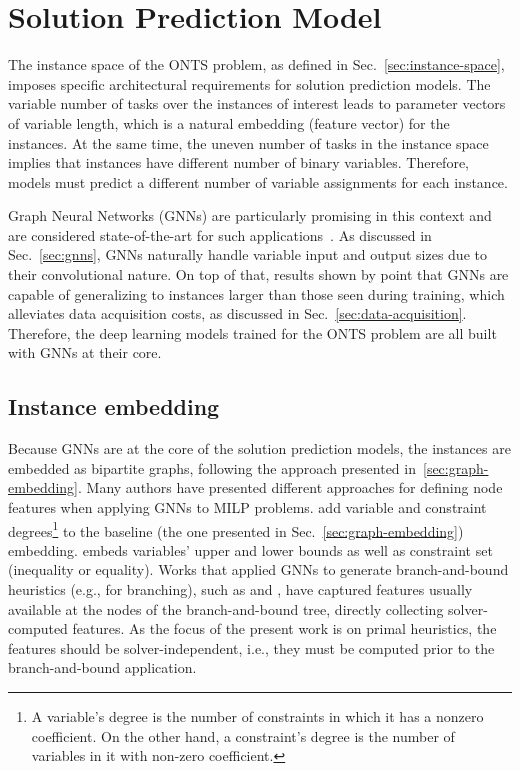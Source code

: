 \section{Solution Prediction Model}

The instance space of the ONTS problem, as defined in Sec.~\ref{sec:instance-space}, imposes specific architectural requirements for solution prediction models.
The variable number of tasks over the instances of interest leads to parameter vectors of variable length, which is a natural embedding (feature vector) for the instances.
At the same time, the uneven number of tasks in the instance space implies that instances have different number of binary variables.
Therefore, models must predict a different number of variable assignments for each instance.

Graph Neural Networks (GNNs) are particularly promising in this context and are considered state-of-the-art for such applications~\cite{cappartCombinatorialOptimizationReasoning2022}.
As discussed in Sec.~\ref{sec:gnns}, GNNs naturally handle variable input and output sizes due to their convolutional nature.
On top of that, results shown by  point that GNNs are capable of generalizing to instances larger than those seen during training, which alleviates data acquisition costs, as discussed in Sec.~\ref{sec:data-acquisition}.
Therefore, the deep learning models trained for the ONTS problem are all built with GNNs at their core.

\subsection{Instance embedding}

Because GNNs are at the core of the solution prediction models, the instances are embedded as bipartite graphs, following the approach presented in~\ref{sec:graph-embedding}.
Many authors have presented different approaches for defining node features when applying GNNs to MILP problems.
 add variable and constraint degrees\footnote{A variable's degree is the number of constraints in which it has a nonzero coefficient. On the other hand, a constraint's degree is the number of variables in it with non-zero coefficient.} to the baseline (the one presented in Sec.~\ref{sec:graph-embedding}) embedding.
 embeds variables' upper and lower bounds as well as constraint set (inequality or equality).
Works that applied GNNs to generate branch-and-bound heuristics (e.g., for branching), such as  and , have captured features usually available at the nodes of the branch-and-bound tree, directly collecting solver-computed features.
As the focus of the present work is on primal heuristics, the features should be solver-independent, i.e., they must be computed prior to the branch-and-bound application.

